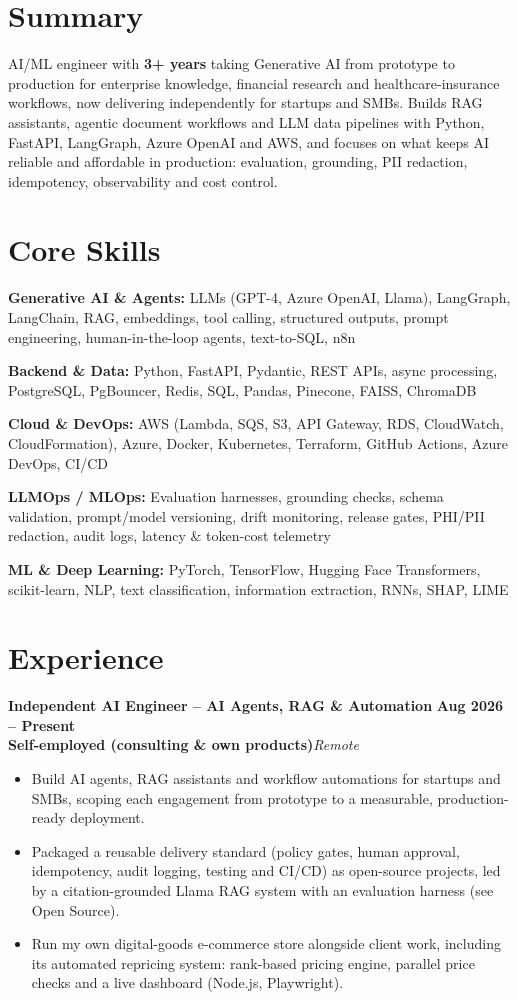 \documentclass[a4paper,10pt]{article}
\newcommand{\role}[4]{%
  {\large\bfseries #1}\hfill{\bfseries\color{accent} #2}\\
  {\color{accent2}\bfseries #3}\hfill{\color{muted}\itshape #4}\par
}
\newcommand{\skill}[2]{{\bfseries\color{accent}#1:} #2\par\vspace{1pt}}
\begin{document}
\section*{Summary}
AI/ML engineer with \textbf{3+ years} taking Generative AI from prototype to production for enterprise
knowledge, financial research and healthcare-insurance workflows, now delivering independently for startups and SMBs. Builds RAG assistants, agentic document
workflows and LLM data pipelines with Python, FastAPI, LangGraph, Azure OpenAI and AWS, and focuses on what
keeps AI reliable and affordable in production: evaluation, grounding, PII redaction, idempotency,
observability and cost control.

\section*{Core Skills}
\skill{Generative AI \& Agents}{LLMs (GPT-4, Azure OpenAI, Llama), LangGraph, LangChain, RAG, embeddings, tool calling, structured outputs, prompt engineering, human-in-the-loop agents, text-to-SQL, n8n}
\skill{Backend \& Data}{Python, FastAPI, Pydantic, REST APIs, async processing, PostgreSQL, PgBouncer, Redis, SQL, Pandas, Pinecone, FAISS, ChromaDB}
\skill{Cloud \& DevOps}{AWS (Lambda, SQS, S3, API Gateway, RDS, CloudWatch, CloudFormation), Azure, Docker, Kubernetes, Terraform, GitHub Actions, Azure DevOps, CI/CD}
\skill{LLMOps / MLOps}{Evaluation harnesses, grounding checks, schema validation, prompt/model versioning, drift monitoring, release gates, PHI/PII redaction, audit logs, latency \& token-cost telemetry}
\skill{ML \& Deep Learning}{PyTorch, TensorFlow, Hugging Face Transformers, scikit-learn, NLP, text classification, information extraction, RNNs, SHAP, LIME}

\section*{Experience}

\role{Independent AI Engineer -- AI Agents, RAG \& Automation}{Aug 2026 -- Present}{Self-employed (consulting \& own products)}{Remote}
\begin{itemize}
  \item Build AI agents, RAG assistants and workflow automations for startups and SMBs, scoping each engagement from prototype to a measurable, production-ready deployment.
  \item Packaged a reusable delivery standard (policy gates, human approval, idempotency, audit logging, testing and CI/CD) as open-source projects, led by a citation-grounded Llama RAG system with an evaluation harness (see Open Source).
  \item Run my own digital-goods e-commerce store alongside client work, including its automated repricing system: rank-based pricing engine, parallel price checks and a live dashboard (Node.js, Playwright).
\end{itemize}
\vspace{4pt}
\end{document}
